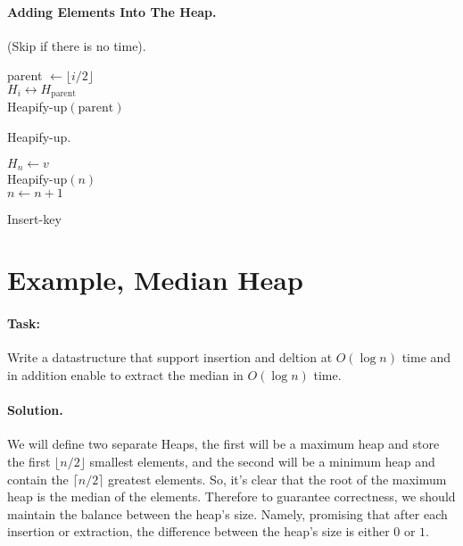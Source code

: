 \paragraph{Adding Elements Into The Heap.} (Skip if there is no time).

\begin{algorithm}
parent $\leftarrow \lfloor i/2 \rfloor $ \\
 { 
  $ H_{i} \leftrightarrow H_{\text{parent}} $ \\ 
  Heapify-up$\left( \text{parent}  \right)$
}
\caption{Heapify-up.}
\end{algorithm}


\begin{algorithm}
$ H_{n} \leftarrow v $ \\ 
Heapify-up$\left( n \right)$\\
$ n \leftarrow n + 1 $ 
\caption{Insert-key}
\end{algorithm}

\fi

\newpage 
\section{Example, Median Heap}

\paragraph{Task:}Write a datastructure that support insertion and deltion at $O\left( \log n \right) $ time and in addition enable to extract the median in $O\left( \log n  \right)$ time. 

\paragraph{Solution.} We will define two separate Heaps, the first will be a maximum heap and store the first $ \lfloor n/2 \rfloor $ smallest elements, and the second will be a minimum heap and contain the $ \lceil n/2 \rceil$ greatest elements. So, it's clear that the root of the maximum heap is the median of the elements. Therefore to guarantee correctness, we should maintain the balance between the heap's size. Namely, promising that after each insertion or extraction, the difference between the heap's size is either $0$ or $1$.

